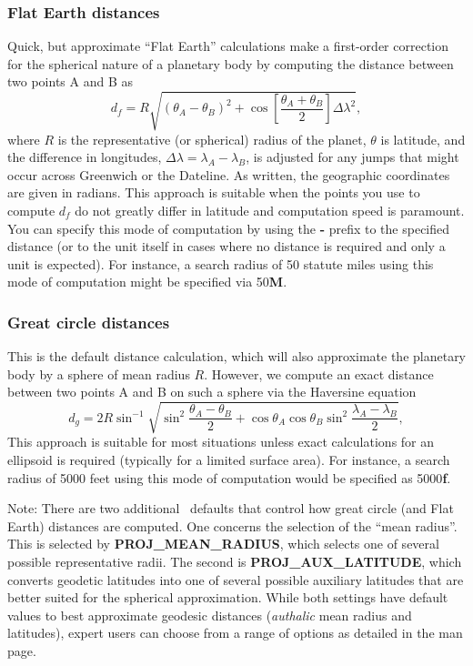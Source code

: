 \subsubsection{Flat Earth distances}
Quick, but approximate ``Flat Earth'' calculations make a first-order correction
for the spherical nature of a planetary body by computing the distance between
two points A and B as
\begin{equation}
	d_f = R \sqrt{(\theta_A - \theta_B)^2 + \cos \left [ \frac{\theta_A + \theta_B}{2} \right ] \Delta \lambda^2},
	\label{eq:flatearth}
\end{equation}
where $R$ is the representative (or spherical) radius of the planet, $\theta$ is latitude, and the
difference in longitudes, $\Delta \lambda = \lambda_A - \lambda_B$,
is adjusted for any jumps that might occur across Greenwich or the Dateline.  As written,
the geographic coordinates are given in radians.  This approach is suitable
when the points you use to compute $d_f$ do not greatly differ in latitude and computation
speed is paramount. You can specify this mode of computation by using the \textbf{-} prefix to
the specified distance (or to the unit itself in cases where no distance is required and only a unit is expected).
For instance, a search radius of 50 statute miles using this mode of computation might be specified via 50\textbf{M}.

\subsubsection{Great circle distances}
This is the default distance calculation, which will also approximate the planetary body by a sphere of mean
radius $R$. However, we compute an exact distance between two points A and B on such a sphere via
the Haversine equation
\begin{equation}
	d_g = 2R \sin^{-1}  {\sqrt{\sin^2\frac{\theta_A - \theta_B}{2} + \cos \theta_A \cos \theta_B \sin^2 \frac{\lambda_A - \lambda_B}{2}} },
	\label{eq:greatcircle}
\end{equation}
This approach is suitable for most situations unless exact calculations for an ellipsoid
is required (typically for a limited surface area).  For instance, a search radius of 5000 feet using this
mode of computation would be specified as 5000\textbf{f}.

Note: There are two additional \gmt\ defaults that control how great circle (and Flat Earth) distances are computed. One concerns the selection
of the ``mean radius''.  This is selected by {\bf PROJ\_MEAN\_RADIUS}, which selects one of several possible
representative radii.  The second is {\bf PROJ\_AUX\_LATITUDE}, which converts geodetic latitudes into one of
several possible auxiliary latitudes that are better suited for the spherical approximation.  While both settings
have default values to best approximate geodesic distances ({\it authalic} mean radius and latitudes),
expert users can choose from a range of options as detailed in the  man page.

